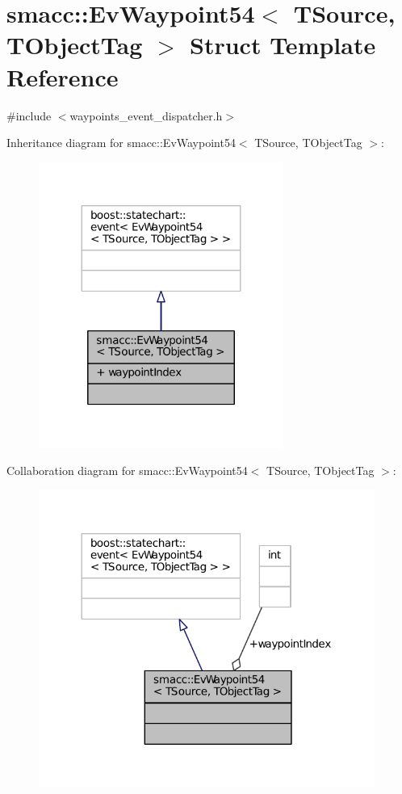 \hypertarget{structsmacc_1_1EvWaypoint54}{}\section{smacc\+:\+:Ev\+Waypoint54$<$ T\+Source, T\+Object\+Tag $>$ Struct Template Reference}
\label{structsmacc_1_1EvWaypoint54}


{\ttfamily \#include $<$waypoints\+\_\+event\+\_\+dispatcher.\+h$>$}



Inheritance diagram for smacc\+:\+:Ev\+Waypoint54$<$ T\+Source, T\+Object\+Tag $>$\+:
\nopagebreak
\begin{figure}[H]
\begin{center}
\leavevmode
\includegraphics[width=227pt]{structsmacc_1_1EvWaypoint54__inherit__graph}
\end{center}
\end{figure}


Collaboration diagram for smacc\+:\+:Ev\+Waypoint54$<$ T\+Source, T\+Object\+Tag $>$\+:
\nopagebreak
\begin{figure}[H]
\begin{center}
\leavevmode
\includegraphics[width=312pt]{structsmacc_1_1EvWaypoint54__coll__graph}
\end{center}
\end{figure}
